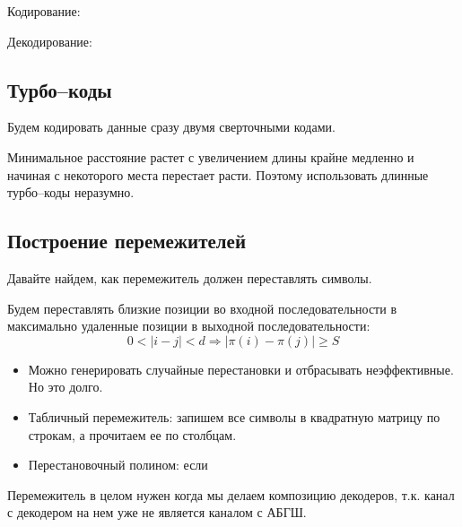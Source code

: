 Кодирование: \?

\?

Декодирование: \?

\subsection{Турбо--коды}

Будем кодировать данные сразу двумя сверточными кодами.

\?

Минимальное расстояние растет с увеличением длины крайне медленно
и начиная с некоторого места перестает расти.
Поэтому использовать длинные турбо--коды неразумно.

\?

\subsection{Построение перемежителей}

Давайте найдем, как перемежитель должен переставлять символы.

Будем переставлять близкие позиции во входной последовательности
в максимально удаленные позиции в выходной последовательности:
\[0 < |i - j|< d \Rightarrow |\pi(i) - \pi(j)| \geq S\]

\begin{itemize}
    \item  Можно генерировать случайные перестановки и отбрасывать неэффективные.
        Но это долго.
    \item  Табличный перемежитель:
        запишем все символы в квадратную матрицу по строкам,
        а прочитаем ее по столбцам.
    \item Перестановочный полином:
        если \?
\end{itemize}

Перемежитель в целом нужен когда мы делаем композицию декодеров,
т.к. канал с декодером на нем уже не является каналом с АБГШ.

\?
